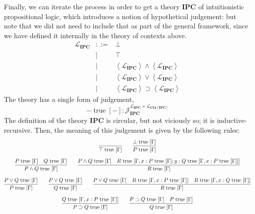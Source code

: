 \documentclass{amsart}
\theoremstyle{definition}
\theoremstyle{remark}
\numberwithin{equation}{section}
\newcommand{\quo}[1]{\left\langle#1\right\rangle}
\begin{document}
Finally, we can iterate the process in order to get a theory $\mathbf{IPC}$ of
intuitionistic propositional logic, which introduces a notion of hypothetical
judgement: but note that we did not need to include that as part of the general
framework, since we have defined it internally in the theory of contexts above.
\[
  \begin{array}{lcl}
    \mathcal{L}_\mathbf{IPC}
      &::= &\bot\\
      &\mid &\top\\
      &\mid &\quo{\mathcal{L}_\mathbf{IPC}}\land\quo{\mathcal{L}_\mathbf{IPC}}\\
      &\mid &\quo{\mathcal{L}_\mathbf{IPC}}\lor\quo{\mathcal{L}_\mathbf{IPC}}\\
      &\mid &\quo{\mathcal{L}_\mathbf{IPC}}\supset\quo{\mathcal{L}_\mathbf{IPC}}
  \end{array}
\]
The theory has a single form of judgement,
\[
  -\;\mathrm{true}\;[-] : \mathcal{J}_\mathbf{IPC}^{\mathcal{L}_\mathbf{IPC}\times\mathcal{L}_{\mathbf{Ctx}[\mathbf{IPC}]}}
\]
The definition of the theory $\mathbf{IPC}$ is circular, but not viciously so;
it is inductive-recursive. Then, the meaning of this judgement is given by the
following rules:
\begin{gather*}
  \infer{\top\;\mathrm{true}\;[\Gamma]}{}
  \qquad
  \infer{P\;\mathrm{true}\;[\Gamma]}{\bot\;\mathrm{true}\;[\Gamma]}\\[6pt]
  \infer{
    P\land Q\;\mathrm{true}\;[\Gamma]
  }{
    P\;\mathrm{true}\;[\Gamma] &
    Q\;\mathrm{true}\;[\Gamma]
  }
  \qquad
  \infer{
    R\;\mathrm{true}\;[\Gamma]
  }{
    P\land Q\;\mathrm{true}\;[\Gamma] &
    R\;\mathrm{true}\;[\Gamma,x:P\;\mathrm{true}\;[\Gamma];y:Q\;\mathrm{true}\;[\Gamma,x:P\;\mathrm{true}\;[\Gamma]]]
  }\\[6pt]
  \infer{
    P\;\mathrm{true}\;[\Gamma]
  }{
    P\lor Q\;\mathrm{true}\;[\Gamma]
  }
  \qquad
  \infer{
    Q\;\mathrm{true}\;[\Gamma]
  }{
    P\lor Q\;\mathrm{true}\;[\Gamma]
  }
  \qquad
  \infer{
    R\;\mathrm{true}\;[\Gamma]
  }{
    P\lor Q\;\mathrm{true}\;[\Gamma] &
    R\;\mathrm{true}\;[\Gamma,x:P\;\mathrm{true}\;[\Gamma]] &
    R\;\mathrm{true}\;[\Gamma,x:Q\;\mathrm{true}\;[\Gamma]]
  }\\[6pt]
  \infer{
    P\supset Q\;\mathrm{true}\;[\Gamma]
  }{
    Q\;\mathrm{true}\;[\Gamma,x:P\;\mathrm{true}\;[\Gamma]]
  }
  \qquad
  \infer{
    Q\;\mathrm{true}\;[\Gamma]
  }{
    P\supset Q\;\mathrm{true}\;[\Gamma] &
    P\;\mathrm{true}\;[\Gamma]
  }
\end{gather*}
\end{document}
